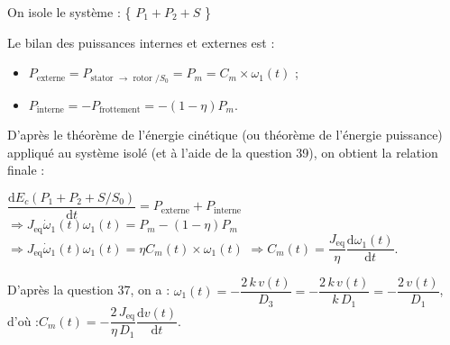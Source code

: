 \begin{corrige}
On isole le système : \{ $P_1 + P_2 + S$ \}

Le bilan des puissances internes et externes est :
\begin{itemize}
\item $P_\text{externe} = P_\text{stator $\to$ rotor $/S_0$} = P_m = C_m \times \omega_1(t)$ ;
\item $P_\text{interne} = -P_\text{frottement} = -(1 - \eta) P_m$.\\
\end{itemize}

D'après le théorème de l'énergie cinétique (ou théorème de l'énergie puissance) appliqué au système isolé (et à l'aide de la question 39), on obtient la relation finale :

$ \dfrac{\text{d} E_c(P_1+P_2+S/S_0)}{\text{d}t} = P_\text{externe} + P_\text{interne}$
$ \Rightarrow  J_\text{eq} \dot\omega_1(t) \omega_1(t) = P_m  - (1 - \eta) P_m$
$ \Rightarrow  J_\text{eq} \dot\omega_1(t) {\omega_1(t)} = \eta C_m(t) \times {\omega_1(t)}$
$ \Rightarrow   C_m(t) = \dfrac{J_\text{eq}}{\eta} \dfrac{\text{d}\omega_1(t)}{\text{d}t}$.

\end{corrige}
\else
\fi

\ifprof
\begin{corrige}
D'après la question 37, on a : $\omega_1(t) = -\dfrac{2 \, k \, v(t)}{D_3} = -\dfrac{2 \, {k} \, v(t)}{{k} \, D_1} = -\dfrac{2 \, v(t)}{D_1} $, d'où :$ C_m(t) = - \dfrac{2 \, J_\text{eq}}{\eta \, D_1} \dfrac{\text{d}v(t)}{\text{d}t}$.
\end{corrige}
\else
\fi

